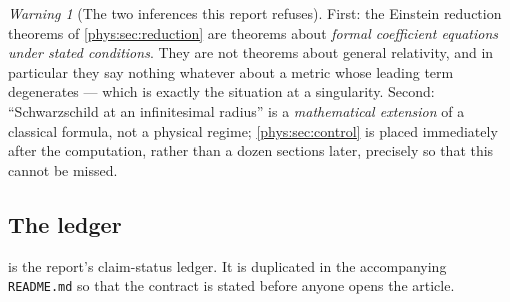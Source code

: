 \documentclass[11pt,letterpaper]{article}
\numberwithin{equation}{section}
\theoremstyle{definition}
\theoremstyle{remark}
\newtheorem{warning}[theorem]{Warning}
\begin{document}
\begin{warning}[The two inferences this report refuses]
\label{phys:warn:refuse}
First: the Einstein reduction theorems of \cref{phys:sec:reduction} are
theorems about \emph{formal coefficient equations under stated conditions}.
They are not theorems about general relativity, and in particular they say
nothing whatever about a metric whose leading term degenerates --- which is
exactly the situation at a singularity. Second: ``Schwarzschild at an
infinitesimal radius'' is a \emph{mathematical extension} of a classical
formula, not a physical regime; \cref{phys:sec:control} is placed immediately
after the computation, rather than a dozen sections later, precisely so that
this cannot be missed.
\end{warning}

\subsection{The ledger}
\label{phys:sub:ledger}

 is the report's claim-status ledger. It is duplicated in
the accompanying \texttt{README.md} so that the contract is stated before
anyone opens the article.
\end{document}
